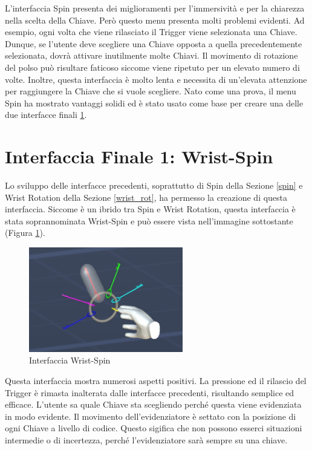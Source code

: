 \documentclass[target=bach,aauheader=]{thud}
\begin{document}
L'interfaccia Spin presenta dei miglioramenti per l'immersività e per la chiarezza nella scelta della Chiave.
Però questo menu presenta molti problemi evidenti.
Ad esempio, ogni volta che viene rilasciato il Trigger viene selezionata una Chiave.
Dunque, se l'utente deve scegliere una Chiave opposta a quella precedentemente selezionata, dovrà attivare inutilmente molte Chiavi. 
Il movimento di rotazione del polso può risultare faticoso siccome viene ripetuto per un elevato numero di volte.
Inoltre, questa interfaccia è molto lenta e necessita di un'elevata attenzione per raggiungere la Chiave che si vuole scegliere.
Nato come una prova, il menu Spin ha mostrato vantaggi solidi ed è stato usato come base per creare una delle due interfacce finali \ref{int_wrist-spin}.  

\section{Interfaccia Finale 1: Wrist-Spin} %
\label{int_wrist-spin}
Lo sviluppo delle interfacce precedenti, soprattutto di Spin della Sezione \ref{spin} e Wrist Rotation della Sezione \ref{wrist_rot}, ha permesso la creazione di questa interfaccia.
Siccome è un ibrido tra Spin e Wrist Rotation, questa interfaccia è stata soprannominata Wrist-Spin e può essere vista nell'immagine sottostante (Figura \ref{fig:wrist_spin}).

\begin{figure}[h]
    \centering
    \includegraphics[width=0.60\textwidth]{wrist_spin}
    \caption{Interfaccia Wrist-Spin}
    \label{fig:wrist_spin}
\end{figure}

Questa interfaccia mostra numerosi aspetti positivi.
La pressione ed il rilascio del Trigger è rimasta inalterata dalle interfacce precedenti, risultando semplice ed efficace.
L'utente sa quale Chiave sta scegliendo perché questa viene evidenziata in modo evidente.
Il movimento dell'evidenziatore è settato con la posizione di ogni Chiave a livello di codice. 
Questo sigifica che non possono esserci situazioni intermedie o di incertezza, perché l'evidenziatore sarà sempre su una chiave.
\end{document}
